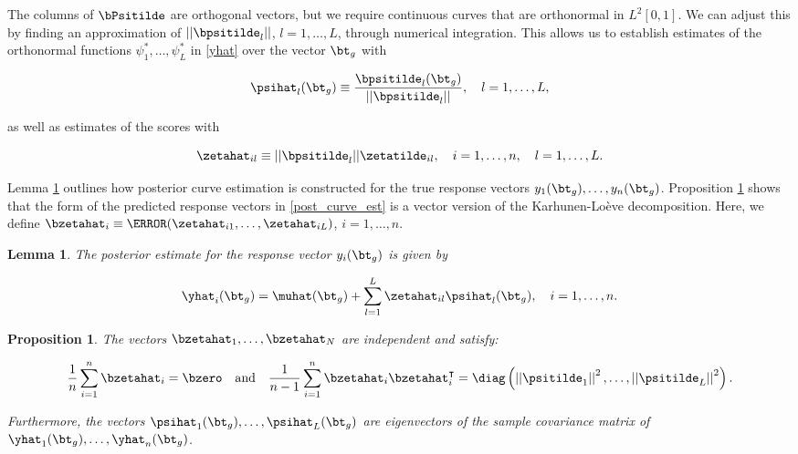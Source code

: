 \documentclass[12pt]{article}
\theoremstyle{plain}
\newtheorem{lemma}[theorem]{Lemma}
\newtheorem{proposition}[theorem]{Proposition}
\theoremstyle{definition}
\theoremstyle{remark}
\begin{document}
\noindent The columns of $\bPsitilde$ are orthogonal vectors, but we require continuous curves that are orthonormal in
$L^2 [0, 1]$. We can adjust this by finding an approximation of $|| \bpsitilde_l ||$, $l = 1, \dots, L$, through numerical
integration. This allows us to establish estimates of the orthonormal functions $\psi^*_1, \dots, \psi^*_L$ in
\eqref{yhat} over the vector $\bt_g$ with

\begin{equation}
	\psihat_l (\bt_g) \equiv \frac{\bpsitilde_l (\bt_g)}{|| \bpsitilde_l ||}, \quad l = 1, \dots, L,
\label{psi_star}
\end{equation}

\noindent as well as estimates of the scores with

\[
	\zetahat_{il} \equiv || \bpsitilde_l || \zetatilde_{il}, \quad i = 1, \dots, n, \quad l = 1, \dots, L.
\]

\noindent Lemma \ref{lem:response_est} outlines how posterior curve estimation is constructed for the
true response vectors $y_1 (\bt_g),
\dots, y_n (\bt_g)$. Proposition \ref{prop:bi_orthogonal} shows that the form of the predicted response vectors
in \eqref{post_curve_est} is a vector version of the Karhunen-Lo\`{e}ve decomposition. Here, we define
$\bzetahat_i \equiv \T{(\zetahat_{i1}, \dots, \zetahat_{iL})}$, $i = 1, \dots, n$.

\begin{lemma}
	
	The posterior estimate for the response vector $y_i (\bt_g)$ is given by
	
	\begin{equation}
		\yhat_i (\bt_g) = \muhat (\bt_g) + \sum_{l=1}^L \zetahat_{il} \psihat_l (\bt_g), \quad i = 1, \dots, n.
	\label{post_curve_est}
	\end{equation}
	
\label{lem:response_est}
\end{lemma}

\begin{proposition}
	
	The vectors $\bzetahat_1, \dots, \bzetahat_N$ are independent and satisfy:
	
	\[
		\frac{1}{n} \sum_{i=1}^n \bzetahat_i = \bzero \quad
		\text{and} \quad
		\frac{1}{n-1} \sum_{i=1}^n \bzetahat_i \bzetahat^{\intercal}_i = \diag \left(
			\left|\left| \psitilde_1 \right|\right|^2, \dots, \left|\left| \psitilde_L \right|\right|^2
		\right).
	\]
	
	\noindent Furthermore, the vectors $\psihat_1 (\bt_g), \dots, \psihat_L (\bt_g)$ are eigenvectors of the sample
	covariance matrix of $\yhat_1 (\bt_g), \dots, \yhat_n (\bt_g)$.
	
\label{prop:bi_orthogonal}
\end{proposition}
\end{document}
